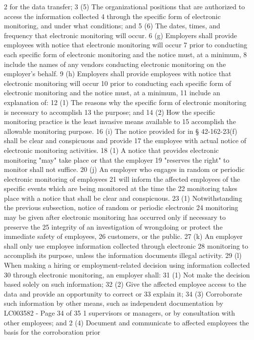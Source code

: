 2 for the data transfer;
3 (5) The organizational positions that are authorized to access the information collected
4 through the specific form of electronic monitoring, and under what conditions; and
5 (6) The dates, times, and frequency that electronic monitoring will occur.
6 (g) Employers shall provide employees with notice that electronic monitoring will occur
7 prior to conducting each specific form of electronic monitoring and the notice must, at a minimum,
8 include the names of any vendors conducting electronic monitoring on the employer’s behalf.
9 (h) Employers shall provide employees with notice that electronic monitoring will occur
10 prior to conducting each specific form of electronic monitoring and the notice must, at a minimum,
11 include an explanation of:
12 (1) The reasons why the specific form of electronic monitoring is necessary to accomplish
13 the purpose; and
14 (2) How the specific monitoring practice is the least invasive means available to
15 accomplish the allowable monitoring purpose.
16 (i) The notice provided for in § 42-162-23(f) shall be clear and conspicuous and provide
17 the employee with actual notice of electronic monitoring activities.
18 (1) A notice that provides electronic monitoring "may" take place or that the employer
19 "reserves the right" to monitor shall not suffice.
20 (j) An employer who engages in random or periodic electronic monitoring of employees
21 will inform the affected employees of the specific events which are being monitored at the time the
22 monitoring takes place with a notice that shall be clear and conspicuous.
23 (1) Notwithstanding the previous subsection, notice of random or periodic electronic
24 monitoring may be given after electronic monitoring has occurred only if necessary to preserve the
25 integrity of an investigation of wrongdoing or protect the immediate safety of employees,
26 customers, or the public.
27 (k) An employer shall only use employee information collected through electronic
28 monitoring to accomplish its purpose, unless the information documents illegal activity.
29 (l) When making a hiring or employment-related decision using information collected
30 through electronic monitoring, an employer shall:
31 (1) Not make the decision based solely on such information;
32 (2) Give the affected employee access to the data and provide an opportunity to correct or
33 explain it;
34 (3) Corroborate such information by other means, such as independent documentation by 
LC003582 - Page 34 of 35
1 supervisors or managers, or by consultation with other employees; and
2 (4) Document and communicate to affected employees the basis for the corroboration prior
